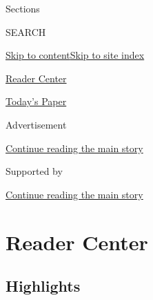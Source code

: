 Sections

SEARCH

\protect\hyperlink{site-content}{Skip to
content}\protect\hyperlink{site-index}{Skip to site index}

\href{https://www.nytimes.com/section/reader-center}{Reader Center}

\href{https://myaccount.nytimes.com/auth/login?response_type=cookie\&client_id=vi}{}

\href{https://www.nytimes.com/section/todayspaper}{Today's Paper}

Advertisement

\protect\hyperlink{after-top}{Continue reading the main story}

Supported by

\protect\hyperlink{after-sponsor}{Continue reading the main story}

\hypertarget{reader-center}{%
\section{Reader Center}\label{reader-center}}

\hypertarget{highlights}{%
\subsection{Highlights}\label{highlights}}

